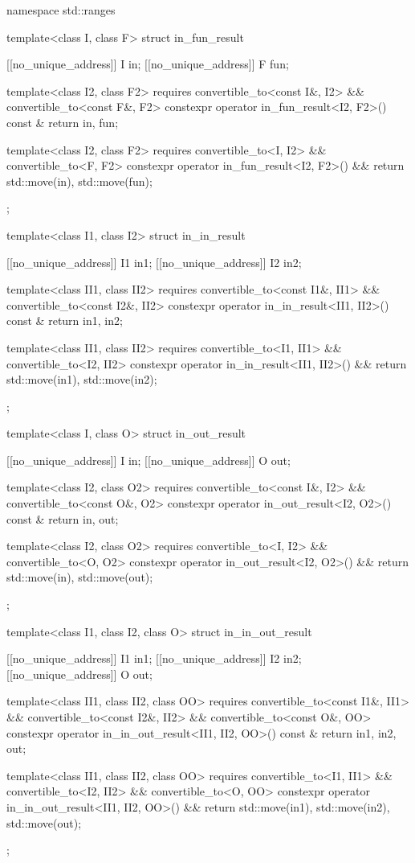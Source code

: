 \begin{codeblock}
namespace std::ranges {
  template<class I, class F>
  struct in_fun_result {
    [[no_unique_address]] I in;
    [[no_unique_address]] F fun;

    template<class I2, class F2>
      requires convertible_to<const I&, I2> && convertible_to<const F&, F2>
    constexpr operator in_fun_result<I2, F2>() const & {
      return {in, fun};
    }

    template<class I2, class F2>
      requires convertible_to<I, I2> && convertible_to<F, F2>
    constexpr operator in_fun_result<I2, F2>() && {
      return {std::move(in), std::move(fun)};
    }
  };

  template<class I1, class I2>
  struct in_in_result {
    [[no_unique_address]] I1 in1;
    [[no_unique_address]] I2 in2;

    template<class II1, class II2>
      requires convertible_to<const I1&, II1> && convertible_to<const I2&, II2>
    constexpr operator in_in_result<II1, II2>() const & {
      return {in1, in2};
    }

    template<class II1, class II2>
      requires convertible_to<I1, II1> && convertible_to<I2, II2>
    constexpr operator in_in_result<II1, II2>() && {
      return {std::move(in1), std::move(in2)};
    }
  };

  template<class I, class O>
  struct in_out_result {
    [[no_unique_address]] I in;
    [[no_unique_address]] O out;

    template<class I2, class O2>
      requires convertible_to<const I&, I2> && convertible_to<const O&, O2>
    constexpr operator in_out_result<I2, O2>() const & {
      return {in, out};
    }

    template<class I2, class O2>
      requires convertible_to<I, I2> && convertible_to<O, O2>
    constexpr operator in_out_result<I2, O2>() && {
      return {std::move(in), std::move(out)};
    }
  };

  template<class I1, class I2, class O>
  struct in_in_out_result {
    [[no_unique_address]] I1 in1;
    [[no_unique_address]] I2 in2;
    [[no_unique_address]] O  out;

    template<class II1, class II2, class OO>
      requires convertible_to<const I1&, II1> &&
               convertible_to<const I2&, II2> &&
               convertible_to<const O&, OO>
    constexpr operator in_in_out_result<II1, II2, OO>() const & {
      return {in1, in2, out};
    }

    template<class II1, class II2, class OO>
      requires convertible_to<I1, II1> &&
               convertible_to<I2, II2> &&
               convertible_to<O, OO>
    constexpr operator in_in_out_result<II1, II2, OO>() && {
      return {std::move(in1), std::move(in2), std::move(out)};
    }
  };

}
\end{codeblock}
